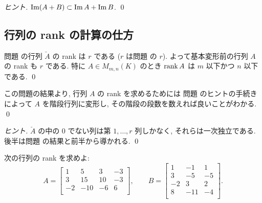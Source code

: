 \documentclass[12pt,twoside]{jarticle}
\begin{document}
\begin{proof}[ヒント]
  $\mathop{\mathrm{Im}}\nolimits(A+B)\subset\mathop{\mathrm{Im}}\nolimits A+\mathop{\mathrm{Im}}\nolimits B$. \qed
\end{proof}


\subsection{行列の rank の計算の仕方}
\label{sec:calc-rank}


\begin{question}
  \label{q:calc-rank}
  問題  の行列 $\check{A}$ の rank は $r$ である
  ($r$ は問題  の $r$).
  よって基本変形前の行列 $A$ の rank も $r$ である.
  特に $A\in M_{m,n}(K)$ のとき $\mathop{\mathrm{rank}}\nolimits A$ は $m$ 以下かつ $n$ 以下である.
  \qed
\end{question}

\begin{rem}
  この問題の結果より, 行列 $A$ の rank を求めるためには
  問題  のヒントの手続きによって $A$ を階段行列に変形し,
  その階段の段数を数えれば良いことがわかる. \qed
\end{rem}

\begin{proof}[ヒント]
  $\check{A}$ の中の $0$ でない列は第 $1,\ldots,r$ 列しかなく,
  それらは一次独立である.
  後半は問題  の結果と前半から導かれる.
  \qed
\end{proof}


\begin{question}
  \label{q:rank-1}
  次の行列の rank を求めよ:
  \begin{equation*}
    A = 
    \begin{bmatrix}
       1 &   5 &  3 & -3 \\
       3 &  15 & 10 & -3 \\
      -2 & -10 & -6 &  6 \\
    \end{bmatrix},
    \qquad
    B = 
    \begin{bmatrix}
       1 &  -1 &  1 \\
       3 &  -5 & -5 \\
      -2 &   3 &  2 \\
       8 & -11 & -4 \\
    \end{bmatrix}.
  \end{equation*}
\end{question}
\end{document}
